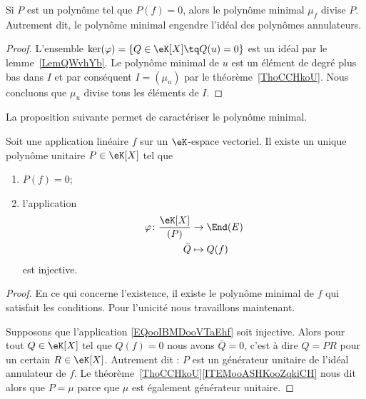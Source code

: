 \begin{proposition}     \label{PropAnnncEcCxj}
    Si \( P\) est un polynôme tel que \( P(f)=0\), alors le polynôme minimal \( \mu_f\) divise \( P\). Autrement dit, le polynôme minimal engendre l'idéal des polynômes annulateurs.
\end{proposition}

\begin{proof}
    L'ensemble \( \ker(\varphi)=\{ Q\in \eK[X]\tq Q(u)=0 \} \) est un idéal par le lemme~\ref{LemQWvhYb}. Le polynôme minimal de \( u\) est un élément de degré plus bas dans \( I\) et par conséquent \( I=(\mu_u)\) par le théorème~\ref{ThoCCHkoU}. Nous concluons que \( \mu_u\) divise tous les éléments de \( I\).
\end{proof}

La proposition suivante permet de caractériser le polynôme minimal.
\begin{proposition}      \label{PROPooVUJPooMzxzjE}
    Soit une application linéaire \( f\) sur un \( \eK\)-espace vectoriel. Il existe un unique polynôme unitaire \( P\in \eK[X]\) tel que
    \begin{enumerate}
        \item
            \( P(f)=0\);
        \item
            l'application
            \begin{equation}        \label{EQooIBMDooVTaEhf}
                \begin{aligned}
                    \varphi\colon \frac{ \eK[X] }{ (P) }&\to \End(E) \\
                    \bar Q&\mapsto Q(f)
                \end{aligned}
            \end{equation}
            est injective.
    \end{enumerate}
\end{proposition}

\begin{proof}
    En ce qui concerne l'existence, il existe le polynôme minimal de \( f\) qui satisfait les conditions. Pour l'unicité nous travaillons maintenant.

    Supposons que l'application \eqref{EQooIBMDooVTaEhf} soit injective. Alors pour tout \( Q\in \eK[X]\) tel que \( Q(f)=0\) nous avons \( \bar Q=0\), c'est à dire \( Q=PR\) pour un certain \( R\in \eK[X]\). Autrement dit : \( P\) est un générateur unitaire de l'idéal annulateur de \( f\). Le théorème~\ref{ThoCCHkoU}\ref{ITEMooASHKooZqkiCH} nous dit alors que \( P=\mu\) parce que \( \mu\) est également générateur unitaire.
\end{proof}

